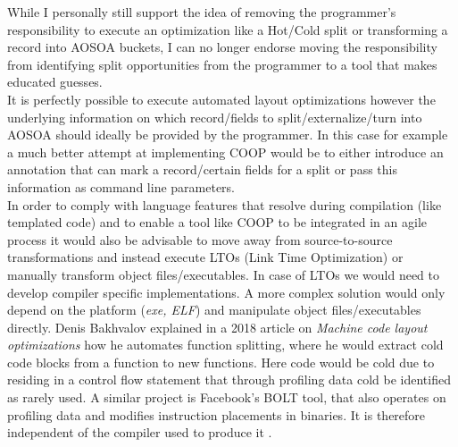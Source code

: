 While I personally still support the idea of removing the programmer's responsibility to execute an optimization like a Hot/Cold split or transforming a record into AOSOA buckets, I can no longer endorse moving the responsibility from identifying split opportunities from the programmer to a tool that makes educated guesses.\\
It is perfectly possible to execute automated layout optimizations however the underlying information on which record/fields to split/externalize/turn into AOSOA should ideally be provided by the programmer. In this case for example a much better attempt at implementing COOP would be to either introduce an annotation that can mark a record/certain fields for a split or pass this information as command line parameters.\\
In order to comply with language features that resolve during compilation (like templated code) and to enable a tool like COOP to be integrated in an agile process it would also be advisable to move away from source-to-source transformations and instead execute LTOs (Link Time Optimization) or manually transform object files/executables. In case of LTOs we would need to develop compiler specific implementations. A more complex solution would only depend on the platform (\textit{exe, ELF}) and manipulate object files/executables directly. Denis Bakhvalov explained in a 2018 article on \textit{Machine code layout optimizations}  how he automates function splitting, where he would extract cold code blocks from a function to new functions. Here code would be cold due to residing in a control flow statement that through profiling data cold be identified as rarely used. A similar project is Facebook's BOLT tool, that also operates on profiling data and modifies instruction placements in binaries. It is therefore independent of the compiler used to produce it .
